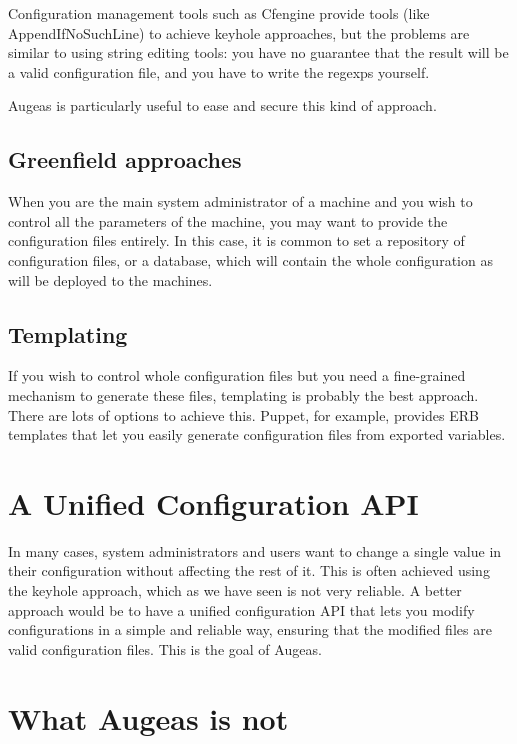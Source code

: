 Configuration management tools such as Cfengine provide tools (like AppendIfNoSuchLine) to achieve keyhole approaches, but the problems are similar to using string editing tools: you have no guarantee that the result will be a valid configuration file, and you have to write the regexps yourself.

Augeas is particularly useful to ease and secure this kind of approach.

\subsection{Greenfield approaches}

When you are the main system administrator of a machine and you wish to control all the parameters of the machine, you may want to provide the configuration files entirely. In this case, it is common to set a repository of configuration files, or a database, which will contain the whole configuration as will be deployed to the machines.

\subsection{Templating}

If you wish to control whole configuration files but you need a fine-grained mechanism to generate these files, templating is probably the best approach. There are lots of options to achieve this. Puppet, for example, provides ERB templates that let you easily generate configuration files from exported variables.

\section{A Unified Configuration API}

In many cases, system administrators and users want to change a single value in their configuration without affecting the rest of it. This is often achieved using the keyhole approach, which as we have seen is not very reliable. A better approach would be to have a unified configuration API that lets you modify configurations in a simple and reliable way, ensuring that the modified files are valid configuration files. This is the goal of Augeas.

\section{What Augeas is not}

